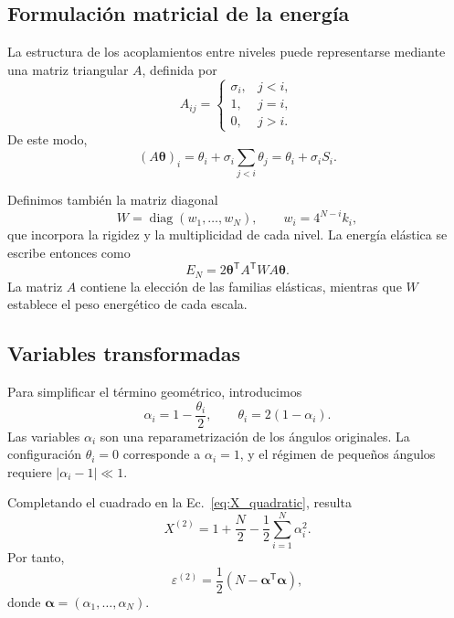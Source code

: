 \documentclass[11pt,a4paper]{article}
\begin{document}
\subsection{Formulación matricial de la energía}

La estructura de los acoplamientos entre niveles puede
representarse mediante una matriz triangular $A$, definida por
\begin{equation}
A_{ij}
=
\begin{cases}
\sigma_i, & j<i,\\
1, & j=i,\\
0, & j>i.
\end{cases}
\label{eq:A_definition}
\end{equation}
De este modo,
\begin{equation}
(A\boldsymbol{\theta})_i
=
\theta_i+\sigma_i\sum_{j<i}\theta_j
=
\theta_i+\sigma_i S_i.
\end{equation}

Definimos también la matriz diagonal
\begin{equation}
W=\operatorname{diag}(w_1,\ldots,w_N),
\qquad
w_i=4^{N-i}k_i,
\label{eq:W_definition}
\end{equation}
que incorpora la rigidez y la multiplicidad de cada nivel.
La energía elástica se escribe entonces como
\begin{equation}
E_N
=
2\boldsymbol{\theta}^{\mathsf T}
A^{\mathsf T}WA
\boldsymbol{\theta}.
\label{eq:energy_matrix_theta}
\end{equation}
La matriz $A$ contiene la elección de las familias elásticas,
mientras que $W$ establece el peso energético de cada escala.

\subsection{Variables transformadas}

Para simplificar el término geométrico, introducimos
\begin{equation}
\alpha_i=1-\frac{\theta_i}{2},
\qquad
\theta_i=2(1-\alpha_i).
\label{eq:alpha_definition}
\end{equation}
Las variables $\alpha_i$ son una reparametrización de los
ángulos originales. La configuración $\theta_i=0$ corresponde
a $\alpha_i=1$, y el régimen de pequeños ángulos requiere
$|\alpha_i-1|\ll 1$.

Completando el cuadrado en la
Ec.~\eqref{eq:X_quadratic}, resulta
\begin{equation}
X^{(2)}
=
1+\frac N2-\frac12\sum_{i=1}^{N}\alpha_i^2.
\label{eq:X_quadratic_alpha}
\end{equation}
Por tanto,
\begin{equation}
\boxed{
\varepsilon^{(2)}
=
\frac12
\left(
N-\boldsymbol{\alpha}^{\mathsf T}\boldsymbol{\alpha}
\right),
}
\label{eq:epsilon_alpha}
\end{equation}
donde $\boldsymbol{\alpha}=(\alpha_1,\ldots,\alpha_N)$.
\end{document}
